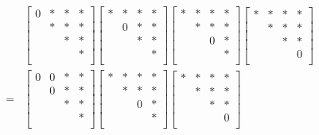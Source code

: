 \documentclass[12pt,twoside]{jarticle}
\begin{document}
\begin{align*}
  &
  \begin{bmatrix}
    0 & * & * & * \\
      & * & * & * \\
      &   & * & * \\
      &   &   & * \\
  \end{bmatrix}
  \begin{bmatrix}
    * & * & * & * \\
      & 0 & * & * \\
      &   & * & * \\
      &   &   & * \\
  \end{bmatrix}
  \begin{bmatrix}
    * & * & * & * \\
      & * & * & * \\
      &   & 0 & * \\
      &   &   & * \\
  \end{bmatrix}
  \begin{bmatrix}
    * & * & * & * \\
      & * & * & * \\
      &   & * & * \\
      &   &   & 0 \\
  \end{bmatrix}
  \\
  = &
  \begin{bmatrix}
    0 & 0 & * & * \\
      & 0 & * & * \\
      &   & * & * \\
      &   &   & * \\
  \end{bmatrix}
  \begin{bmatrix}
    * & * & * & * \\
      & * & * & * \\
      &   & 0 & * \\
      &   &   & * \\
  \end{bmatrix}
  \begin{bmatrix}
    * & * & * & * \\
      & * & * & * \\
      &   & * & * \\
      &   &   & 0 \\
  \end{bmatrix}

\end{align*}
\end{document}
